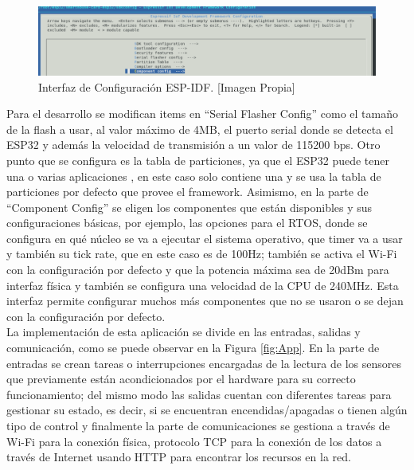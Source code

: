 \begin{figure}[H]
	\centering
	\caption[Interfaz de Configuración ESP-IDF.]{Interfaz de Configuración ESP-IDF. [Imagen Propia]}
	\label{fig:Kconf}
	\includegraphics[width=\linewidth]{Imagenes/Kgui}
\end{figure}

Para el desarrollo se modifican items en ``Serial Flasher Config'' como el tamaño de la flash a usar, al valor máximo de 4MB, el puerto serial donde se detecta el ESP32 y además la velocidad de transmisión a un valor de 115200 bps. Otro punto que se configura es la tabla de particiones, ya que el ESP32 puede tener una o varias aplicaciones \cite{ES}, en este caso solo contiene una y se usa la tabla de particiones por defecto que provee el framework. Asimismo, en la parte de ``Component Config'' se eligen los componentes que están disponibles y sus configuraciones básicas, por ejemplo, las opciones para el RTOS, donde se configura en qué núcleo se va a ejecutar el sistema operativo, que timer va a usar y también su tick rate, que en este caso es de 100Hz; también se activa el Wi-Fi con la configuración por defecto y que la potencia máxima sea de 20dBm para interfaz física y también se configura una velocidad de la CPU de 240MHz. Esta interfaz permite configurar muchos más componentes que no se usaron o se dejan con la configuración por defecto.\\


La implementación de esta aplicación se divide en las entradas, salidas y comunicación, como se puede observar en la Figura \ref{fig:App}. En la parte de entradas se crean tareas o interrupciones encargadas de la lectura de los sensores que previamente están acondicionados por el hardware para su correcto funcionamiento; del mismo modo las salidas cuentan con diferentes tareas para gestionar su estado, es decir, si se encuentran encendidas/apagadas o tienen algún tipo de control y finalmente la parte de comunicaciones se gestiona a través de Wi-Fi para la conexión física, protocolo TCP para la conexión de los datos a través de Internet usando HTTP para encontrar los recursos en la red.

